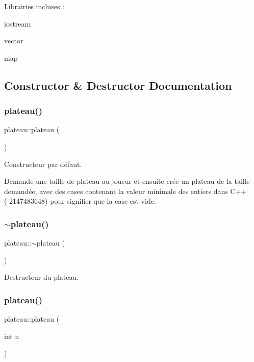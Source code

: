 Librairies incluses \+:
\begin{DoxyItemize}
\item iostream
\item vector
\item map 
\end{DoxyItemize}

\subsection{Constructor \& Destructor Documentation}
\mbox{\label{classplateau_a4a106572264e08856397e78371cd047b}} 
\subsubsection{\texorpdfstring{plateau()}{plateau()}\hspace{0.1cm}{\footnotesize\ttfamily [1/2]}}
{\footnotesize\ttfamily plateau\+::plateau (\begin{DoxyParamCaption}{ }\end{DoxyParamCaption})}



Constructeur par défaut. 

Demande une taille de plateau au joueur et ensuite crée un plateau de la taille demandée, avec des cases contenant la valeur minimale des entiers dans C++ (-\/2147483648) pour signifier que la case est vide. \mbox{\label{classplateau_a336a9f14762c3821cf717cca91f6ca86}} 
\subsubsection{\texorpdfstring{$\sim$plateau()}{~plateau()}}
{\footnotesize\ttfamily plateau\+::$\sim$plateau (\begin{DoxyParamCaption}{ }\end{DoxyParamCaption})}



Destructeur du plateau. 

\mbox{\label{classplateau_a4e5cc7f71d0a559f595e48e2533a6a00}} 
\subsubsection{\texorpdfstring{plateau()}{plateau()}\hspace{0.1cm}{\footnotesize\ttfamily [2/2]}}
{\footnotesize\ttfamily plateau\+::plateau (\begin{DoxyParamCaption}\item[{int}]{n }\end{DoxyParamCaption})}



